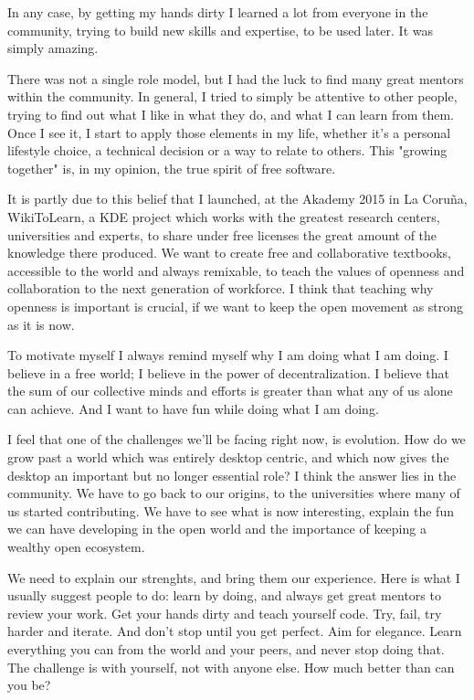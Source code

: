 In any case, by getting my hands dirty I learned a lot from everyone in the community, trying to build new skills and expertise, to be used later. It was simply amazing.

There was not a single role model, but I had the luck to find many great mentors within the community. In general, I tried to simply be attentive to other people, trying to find out what I like in what they do, and what I can learn from them. Once I see it, I start to apply those elements in my life, whether it's a personal lifestyle choice, a technical decision or a way to relate to others. This "growing together" is, in my opinion, the true spirit of free software.

It is partly due to this belief that I launched, at the Akademy 2015 in La Coruña, WikiToLearn, a KDE project which works with the greatest research centers, universities and experts, to share under free licenses the great amount of the knowledge there produced. We want to create free and collaborative textbooks, accessible to the world and always remixable, to teach the values of openness and collaboration to the next generation of workforce. I think that teaching why openness is important is crucial, if we want to keep the open movement as strong as it is now.

To motivate myself I always remind myself why I am doing what I am doing. I believe in a free world; I believe in the power of decentralization. I believe that the sum of our collective minds and efforts is greater than what any of us alone can achieve. And I want to have fun while doing what I am doing.

I feel that one of the challenges we'll be facing right now, is evolution. How do we grow past a world which was entirely desktop centric, and which now gives the desktop an important but no longer essential role? I think the answer lies in the community. We have to go back to our origins, to the universities where many of us started contributing. We have to see what is now interesting, explain the fun we can have developing in the open world and the importance of keeping a wealthy open ecosystem.

We need to explain our strenghts, and bring them our experience. Here is what I usually suggest people to do: learn by doing, and always get great mentors to review your work. Get your hands dirty and teach yourself code. Try, fail, try harder and iterate. And don't stop until you get perfect. Aim for elegance. Learn everything you can from the world and your peers, and never stop doing that. The challenge is with yourself, not with anyone else. How much better than can you be?

